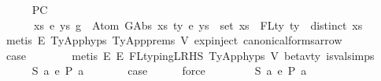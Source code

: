 \begin{isabellebody}
\ \ \ \ \isamarkupfalse%
\ P{}C{\isacharcolon}{\kern0pt}\isanewline
\ \ \ \ \ \ {\isachardoublequoteopen}{\isasymexists}xs\ e{\isacharprime}{\kern0pt}\ ys{\isachardot}{\kern0pt}\ g{}\ {\isasymsimeq}\ Atom\ {\isacharparenleft}{\kern0pt}GAbs\ xs\ ty{}\ e{\isacharprime}{\kern0pt}{\isacharparenright}{\kern0pt}\ ys\ {\isasymand}\ set\ xs\ {\isacharequal}{\kern0pt}\ FLty\ ty{}\ {\isasymand}\ distinct\ xs{\isachardoublequoteclose}\isanewline
\ \ \ \ \ \isamarkupfalse%
\ {\isacharparenleft}{\kern0pt}metis\ E{}\ TyApp{\isachardot}{\kern0pt}hyps{\isacharparenleft}{\kern0pt}{}{\isacharparenright}{\kern0pt}\ TyApp{\isachardot}{\kern0pt}prems\ V{}\ exp{\isachardot}{\kern0pt}inject{\isacharparenleft}{\kern0pt}{}{\isacharparenright}{\kern0pt}\ canonical{\isacharunderscore}{\kern0pt}forms{\isacharunderscore}{\kern0pt}arrow{\isacharparenright}{\kern0pt}\isanewline
\isanewline
\ \ \ \ \isamarkupfalse%
\ \isamarkupfalse%
\ {\isacharquery}{\kern0pt}case\isanewline
\ \ \ \ \ \ \isamarkupfalse%
\ {\isacharparenleft}{\kern0pt}metis\ E{}\ E{}\ FL{\isacharunderscore}{\kern0pt}typing{\isacharunderscore}{\kern0pt}LRHS\ TyApp{\isachardot}{\kern0pt}hyps{\isacharparenleft}{\kern0pt}{}{\isacharparenright}{\kern0pt}\ V{}\ beta{\isacharunderscore}{\kern0pt}v{\isacharunderscore}{\kern0pt}ty\ is{\isacharunderscore}{\kern0pt}val{\isachardot}{\kern0pt}simps{\isacharparenleft}{\kern0pt}{}{\isacharparenright}{\kern0pt}{\isacharparenright}{\kern0pt}\isanewline
\ \ \isamarkupfalse%
\isanewline
\ \ \ \ \isamarkupfalse%
\ S{\isacharcolon}{\kern0pt}\ {\isachardoublequoteopen}{\isacharparenleft}{\kern0pt}{\isasymexists}a{\isachardot}{\kern0pt}\ e{}\ {\isacharminus}{\kern0pt}{\isachargreater}{\kern0pt}{\isacharbraceleft}{\kern0pt}P{\isacharbraceright}{\kern0pt}\ a{\isacharparenright}{\kern0pt}{\isachardoublequoteclose}\isanewline
\ \ \ \ \isamarkupfalse%
\ \isamarkupfalse%
\ {\isacharquery}{\kern0pt}case\isanewline
\ \ \ \ \isamarkupfalse%
\ force\isanewline
\ \ \isamarkupfalse%
\isanewline
\ \ \ \ \isamarkupfalse%
\ S{\isacharcolon}{\kern0pt}\ {\isachardoublequoteopen}{\isacharparenleft}{\kern0pt}{\isasymexists}a{\isachardot}{\kern0pt}\ e{}\ {\isacharminus}{\kern0pt}{\isachargreater}{\kern0pt}{\isacharbraceleft}{\kern0pt}P{\isacharbraceright}{\kern0pt}\ a{\isacharparenright}{\kern0pt}{\isachardoublequoteclose}\isanewline

\end{isabellebody}
